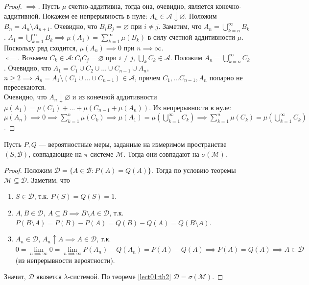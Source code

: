         \begin{proof}
            $\implies$. Пусть $\mu$ счетно-аддитивна, тогда она, очевидно, является конечно-аддитивной. Покажем ее непрерывность в нуле: $A_n \in \mathcal{A} \downarrow \varnothing$. Положим $B_n = A_n \setminus A_{n + 1}$. Очевидно, что $B_iB_j = \varnothing$ при $i \neq j$. Заметим, что $A_n = \bigcup\limits_{k = n}^{\infty}B_k$. $A_1 = \bigcup\limits_{k = 1}^{\infty}B_k \implies \mu(A_1) = \sum\limits_{k = 1}^{\infty} \mu(B_k)$ в силу счетной аддитивности $\mu$. Поскольку ряд сходится, $\mu(A_n) \implies 0$ при $n \implies \infty$.\\
            $\impliedby$. Возьмем $C_k \in \mathcal{A} : C_iC_j = \varnothing$ при $i \neq j$, $\bigcup\limits_k C_k \in \mathcal{A}$. Положим $A_n = \bigcup\limits_{k = n}^{\infty} C_k$. Очевидно, что $A_1 = C_1 \cup C_2 \cup \dots \cup C_{n - 1} \cup A_n$, $n \geq 2 \implies A_n = A_1 \setminus (C_1 \cup \dots \cup C_{n - 1}) \in \mathcal{A}$, причем $C_1, \dots C_{n - 1}, A_n$ попарно не пересекаются.\\
            Очевидно, что $A_n \downarrow \varnothing$ и из конечной аддитивности $\mu(A_1) = \mu(C_1) + \dots + \mu(C_{n - 1} + \mu(A_n))$. Из непрерывности в нуле: $\mu(A_n) \implies 0 \implies \sum\limits_{k = 1}^n \mu(C_k) \implies \mu(A_1) = \mu(\bigcup\limits_{k = 1}^{\infty} C_k) \implies \sum\limits_{k = 1}^n \mu(C_k) = \mu(\bigcup\limits_{k = 1}^{\infty} C_k)$. 
        \end{proof}
        \begin{theorem}\label{lect02:th4}
            Пусть $P, Q$ --- вероятностные меры, заданные на измеримом пространстве $(S, \mathcal{B})$, совпадающие на $\pi$-системе $\mathcal{M}$. Тогда они совпадают на $\sigma (\mathcal{M})$. 
        \end{theorem}
        \begin{proof}
            Положим $\mathcal{D} = \{ A \in \mathcal{B}: P(A) = Q(A)\}$. Тогда по условию теоремы $\mathcal{M} \subseteq \mathcal{D}$. Заметим, что
            \begin{enumerate}
                \item $S \in \mathcal{D}$, т.к. $P(S) = Q(S) = 1$.
                \item $A, B \in \mathcal{D}, \ A \subseteq B \implies B \setminus A \in \mathcal{D}$, т.к. $P(B \setminus A) = P(B) - P(A) = Q(B) - Q(A) = Q(B \setminus A)$.
                \item $A_n \in \mathcal{D}$, $A_n \uparrow A \implies A \in \mathcal{D}$, т.к. $0 = \lim\limits_{n \implies \infty} 0 = \lim\limits_{n \implies \infty} P(A_n) - Q(A_n) = P(A) - Q(A) \implies P(A) = Q(A) \implies A \in \mathcal{D}$ (из непрерывности вероятности).
            \end{enumerate}
            Значит, $\mathcal{D}$ является $\lambda$-системой. По теореме \ref{lect01:th2} $\mathcal{D} = \sigma (\mathcal{M})$.
        \end{proof}
